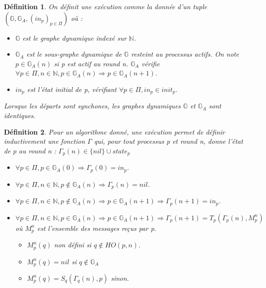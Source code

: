 \documentclass{article}
\newtheorem{definition}{Définition}
\begin{document}
\begin{definition}

On définit une exécution comme la donnée d'un tuple
$( \mathds{G},  \mathds{G}_A, (in_p)_{p \in \Pi})$ où :

\begin{itemize}

	\item $\mathds{G}$ est le graphe dynamique indexé sur $\mathds{N}$.
	\item $\mathds{G}_A$ est le sous-graphe dynamique de $\mathds{G}$ resteint au processus actifs.
		On note $p \in \mathds{G}_A(n)$ si p est actif au round n.
		$\mathds{G}_A$ vérifie $\forall p \in \Pi,  n \in \mathds{N}, p \in \mathds{G}_A(n) \Rightarrow p \in \mathds{G}_A(n+1)$.
	\item $in_p$ est l'état initial de p, vérifiant $\forall p \in \Pi, in_p \in init_p$.

\end{itemize}
Lorsque les départs sont synchones, les graphes dynamiques $\mathds{G}$ et $\mathds{G}_A$ sont identiques.
\end{definition}

\begin{definition}
	Pour un algorithme donné, une exécution permet de définir inductivement une fonction $\Gamma$ qui,
	pour tout processus p et round n, donne l'état de p au round n : $\Gamma_p(n) \in \{nil\} \cup state_p$
	\begin{itemize}
		\item $\forall p \in \Pi, p \in \mathds{G}_A(0) \Rightarrow \Gamma_p(0) = in_p$.
		\item $\forall p \in \Pi, n \in \mathds{N}, p \notin \mathds{G}_A(n) \Rightarrow \Gamma_p(n) = nil$.
		\item $\forall p \in \Pi, n \in \mathds{N}, p \notin \mathds{G}_A(n) \Rightarrow p \in \mathds{G}_A(n+1) \Rightarrow \Gamma_p(n+1) = in_p$.
		\item $\forall p \in \Pi, n \in \mathds{N}, p \in    \mathds{G}_A(n) \Rightarrow p \in \mathds{G}_A(n+1) \Rightarrow \Gamma_p(n+1) = T_p (\Gamma_p(n) ,M_p^n)$
			où $M_p^n$ est l'ensemble des messages reçus par p.
		\begin{itemize}
			\item $M_p^n(q)$ non défini si $q \notin HO(p, n)$.
			\item $M_p^n(q) = nil$ si $q \notin \mathds{G}_A$
			\item $M_p^n(q) = S_q (\Gamma_q(n), p)$ sinon.
		\end{itemize}

	\end{itemize}
\end{definition}
\end{document}
